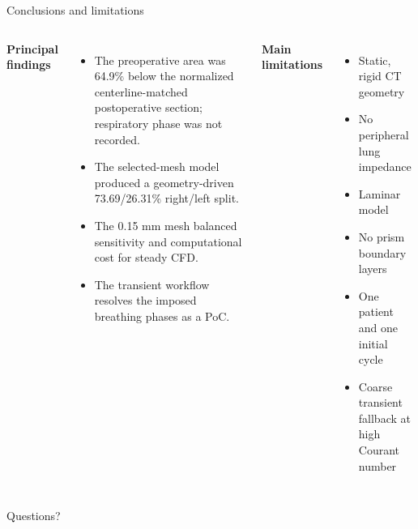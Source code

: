 \documentclass[aspectratio=169,11pt]{beamer}
\begin{document}
\begin{frame}{Conclusions and limitations}
  \begin{columns}[T,onlytextwidth]
      \textbf{Principal findings}
      \begin{itemize}
        \item The preoperative area was 64.9\% below the normalized centerline-matched postoperative section; respiratory phase was not recorded.
        \item The selected-mesh model produced a geometry-driven 73.69/26.31\% right/left split.
        \item The 0.15 mm mesh balanced sensitivity and computational cost for steady CFD.
        \item The transient workflow resolves the imposed breathing phases as a PoC.
      \end{itemize}
      \textbf{Main limitations}
      \begin{itemize}
        \item Static, rigid CT geometry
        \item No peripheral lung impedance
        \item Laminar model
        \item No prism boundary layers
        \item One patient and one initial cycle
        \item Coarse transient fallback at high Courant number
      \end{itemize}
  \end{columns}
  \vfill
  \centering\Large Questions?
\end{frame}
\end{document}
